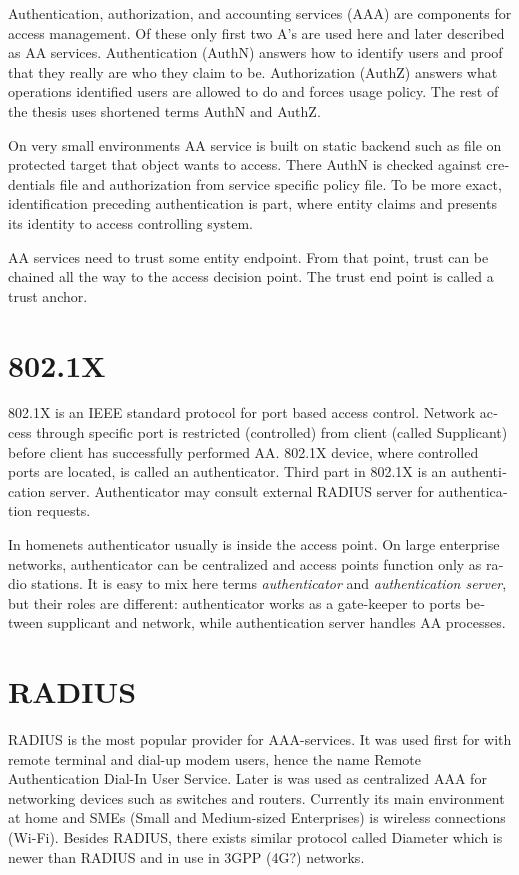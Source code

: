 \documentclass[12pt,a4paper,english]{tutthesis}
\begin{document}
\begin{otherlanguage}{english}
Authentication, authorization, and accounting services (AAA) are
components for access management. Of these only first two A's are used
here and later described as AA services. Authentication (AuthN)
answers how to identify users and proof that they really are
who they claim to be. Authorization (AuthZ) answers what operations
identified users are allowed to do and forces usage policy. The rest of the thesis uses
shortened terms AuthN and AuthZ.

On very small environments AA service is built on static backend such
as file on protected target that object wants to access. There AuthN
is checked against credentials file and authorization from service
specific policy file. 
To be more exact, identification preceding authentication is part,
where entity claims and presents its identity to 
access controlling system.

AA services need to trust some entity endpoint. From that point, trust
can be chained all the way to the access decision point. The trust end
point is called a trust anchor.


\section{802.1X}
\label{sec-2-1}

802.1X is an IEEE standard protocol for port based access
control. Network access through specific port is
restricted (controlled) from client (called Supplicant) before
client has successfully performed AA. 802.1X device, where controlled ports
are located, is called an authenticator. Third part in 802.1X is an
authentication server. Authenticator may consult external RADIUS
server for authentication requests. 


In homenets authenticator usually is inside the access point.
On large enterprise networks, authenticator can be centralized 
and access points function only as radio stations.
It is easy to mix here terms \emph{authenticator} and \emph{authentication
server}, but their roles are different: authenticator works as a
gate-keeper to ports between supplicant and network, while
authentication server handles AA processes.

\section{RADIUS}
\label{sec-2-2}
\label{section:radius}
RADIUS is the most popular provider for
AAA-services\cite[p.75]{radius-popular}.  It was used first for
with remote terminal and dial-up modem users, hence the name Remote
Authentication Dial-In User Service. Later is was used as centralized AAA
for networking devices such as switches and routers.  Currently its
main environment at home and SMEs (Small and Medium-sized Enterprises) is
wireless connections (Wi-Fi).  Besides RADIUS, there exists similar protocol
called Diameter which is newer than RADIUS and in use in 3GPP (4G?)
networks. 


\end{otherlanguage}
\end{document}
